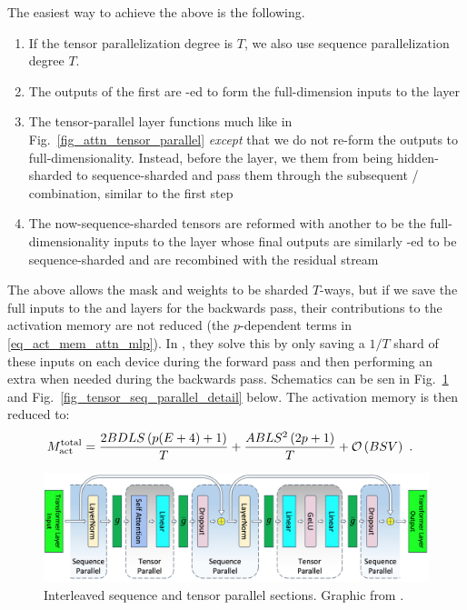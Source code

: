 \documentclass[11pt]{article}
\begin{document}
The easiest way to achieve the above is the following.
\begin{enumerate}
	\item If the tensor parallelization degree is $ T $, we also use sequence parallelization degree $ T
	      $.
	\item The outputs of the first  are -ed to form the full-dimension
	      inputs to the   layer
	\item The tensor-parallel  layer functions much like in
	      Fig.~\ref{fig_attn_tensor_parallel} \textit{except} that we do not re-form the outputs to
	      full-dimensionality.  Instead, before the  layer, we  them
	      from being hidden-sharded to sequence-sharded and pass them through the subsequent
	      / combination, similar to the first step
	\item The now-sequence-sharded tensors are reformed with another  to be the full-dimensionality inputs to the
	       layer whose final outputs are similarly -ed to be
	      sequence-sharded and are recombined with the residual stream
\end{enumerate}
The above allows the  mask and  weights to be sharded $ T
$-ways, but if we save the full inputs to the  and   layers
for the backwards pass, their contributions to the activation memory are not reduced (the $ p
$-dependent terms in \eqref{eq_act_mem_attn_mlp}). In \cite{korthikanti2022reducing}, they solve
this by only saving a $ 1/T $ shard of these inputs on each device during the forward pass and then
performing an extra  when needed during the backwards pass. Schematics can be
sen in Fig.~\ref{fig_tensor_seq_parallel} and Fig.~\ref{fig_tensor_seq_parallel_detail} below. The
activation memory is then reduced to:
\begin{align}
	M _{ {\rm act}  } ^{ {\rm  total}  } & =\frac{ 2BDLS   \left ( p(E+4) + 1   \right ) }{ T }
	+ \frac{ ABLS ^{ 2 } \left ( 2p+1\right ) }{ T }  + \mathcal{O} \left( BSV \right) \label{eq_act_mem_total_seq_parallel}\ .
\end{align}


\begin{figure}[ht]
	\centering
	\includegraphics[scale=.25]{figures/transformer-tensor-sequence-parallel.jpg}
	\caption{Interleaved sequence and tensor parallel sections. Graphic from
		\cite{shoeybi2020megatronlm}. }
	\label{fig_tensor_seq_parallel}
\end{figure}
\end{document}
